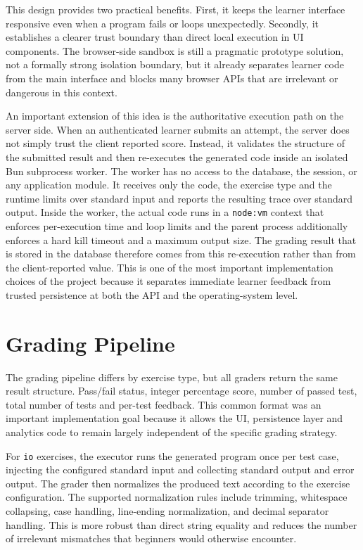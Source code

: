This design provides two practical benefits. First, it keeps the learner interface
responsive even when a program fails or loops unexpectedly.
Secondly, it establishes a clearer trust boundary than direct local execution in UI components.
The browser-side sandbox is still a pragmatic prototype solution,
not a formally strong isolation boundary,
but it already separates learner code from the
main interface and blocks many browser APIs that are irrelevant or dangerous in this context.

An important extension of this idea is the authoritative execution path on the server side.
When an authenticated learner submits an attempt, the server does not simply trust the client
reported score. Instead, it validates the structure of the submitted result and then re-executes
the generated code inside an isolated Bun subprocess worker.
The worker has no access to the database, the session, or any application module.
It receives only the code, the exercise type and the runtime limits over standard input
and reports the resulting trace over standard output.
Inside the worker, the actual code runs in a \texttt{node:vm} context that
enforces per-execution time and loop limits and the parent process additionally
enforces a hard kill timeout and a maximum output size.
The grading result that is stored in the database therefore comes from
this re-execution rather than from the client-reported value.
This is one of the most important implementation choices of the project
because it separates immediate learner feedback from trusted persistence at
both the API and the operating-system level.

\section{Grading Pipeline}
\label{sec:grading-pipeline}
The grading pipeline differs by exercise type, but all graders return the same result structure.
Pass/fail status, integer percentage score, number of passed test, total number of tests and
per-test feedback. This common format was an important implementation goal because it allows the UI,
persistence layer and analytics code to remain largely independent of the specific grading strategy.

For \texttt{io} exercises, the executor runs the generated program once per test case,
injecting the configured standard input and collecting standard output and error output.
The grader then normalizes the produced text according to the exercise configuration.
The supported normalization rules include trimming, whitespace collapsing, case handling,
line-ending normalization, and decimal separator handling.
This is more robust than direct string equality and reduces the number of irrelevant
mismatches that beginners would otherwise encounter.

